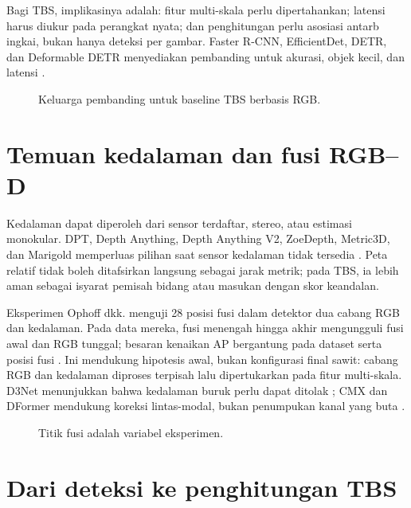 Bagi TBS, implikasinya adalah: fitur multi-skala perlu dipertahankan; latensi
harus diukur pada perangkat nyata; dan penghitungan perlu asosiasi antarb ingkai,
bukan hanya deteksi per gambar. Faster R-CNN, EfficientDet, DETR, dan Deformable
DETR menyediakan pembanding untuk akurasi, objek kecil, dan latensi
\cite{ren2017fasterrcnn,tan2020efficientdet,carion2020detr,zhu2021deformabledetr}.

\begin{figure}[htbp]
\centering
{}
\caption{Keluarga pembanding untuk baseline TBS berbasis RGB.}
\label{fig:rgb}
\end{figure}

\section{Temuan kedalaman dan fusi RGB--D}

Kedalaman dapat diperoleh dari sensor terdaftar, stereo, atau estimasi
monokular. DPT, Depth Anything, Depth Anything V2, ZoeDepth, Metric3D, dan
Marigold memperluas pilihan saat sensor kedalaman tidak tersedia
\cite{ranftl2021dpt,yang2024depthanything,yang2024depthanythingv2,bhat2023zoedepth,yin2023metric3d,ke2024marigold}.
Peta relatif tidak boleh ditafsirkan langsung sebagai jarak metrik; pada TBS,
ia lebih aman sebagai isyarat pemisah bidang atau masukan dengan skor keandalan.

Eksperimen Ophoff dkk. menguji 28 posisi fusi dalam detektor dua cabang RGB dan
kedalaman. Pada data mereka, fusi menengah hingga akhir mengungguli fusi awal dan
RGB tunggal; besaran kenaikan AP bergantung pada dataset serta posisi fusi
\cite{ophoff2019multimodal}. Ini mendukung hipotesis awal, bukan konfigurasi
final sawit: cabang RGB dan kedalaman diproses terpisah lalu dipertukarkan pada
fitur multi-skala. D3Net menunjukkan bahwa kedalaman buruk perlu dapat ditolak
\cite{fan2020d3net}; CMX dan DFormer mendukung koreksi lintas-modal, bukan
penumpukan kanal yang buta \cite{zhang2023cmx,yin2024dformer}.

\begin{figure}[htbp]
\centering
{}
\caption{Titik fusi adalah variabel eksperimen.}
\label{fig:fusion}
\end{figure}

\section{Dari deteksi ke penghitungan TBS}

